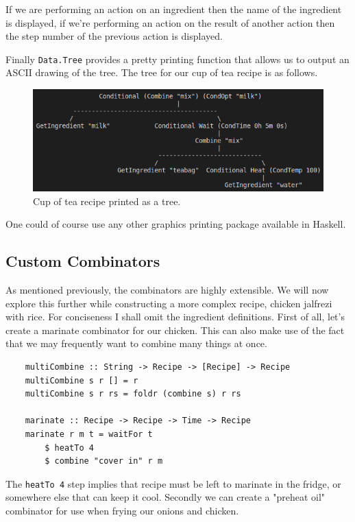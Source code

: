 \documentclass[11pt]{article}
\begin{document}
If we are performing an action on an ingredient then the name of the ingredient is
displayed, if we're performing an action on the result of another action then the
step number of the previous action is displayed.

\medbreak

Finally \texttt{Data.Tree} provides a pretty printing function that allows us
to output an ASCII drawing of the tree. The tree for our cup of tea recipe is
as follows.

\begin{figure}[h]
\includegraphics[width=\textwidth, keepaspectratio]{cupOfTea.png}
\centering
\caption{Cup of tea recipe printed as a tree.}
\end{figure}

One could of course use any other graphics printing package available in Haskell.

\subsection{Custom Combinators}

As mentioned previously, the combinators are highly extensible. We will now explore this
further while constructing a more complex recipe, chicken jalfrezi with rice.
For conciseness I shall omit the ingredient definitions. First of all, let's
create a marinate combinator for our chicken. This can also make use of the
fact that we may frequently want to combine many things at once.

\begin{lstlisting}
    multiCombine :: String -> Recipe -> [Recipe] -> Recipe
    multiCombine s r [] = r
    multiCombine s r rs = foldr (combine s) r rs

    marinate :: Recipe -> Recipe -> Time -> Recipe
    marinate r m t = waitFor t
        $ heatTo 4
        $ combine "cover in" r m
\end{lstlisting}

The \texttt{heatTo 4} step implies that recipe must be left to marinate in the fridge,
or somewhere else that can keep it cool. Secondly we can create a "preheat oil" combinator
for use when frying our onions and chicken.
\end{document}
